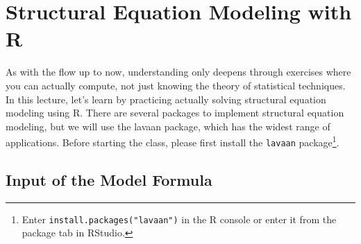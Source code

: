 \documentclass{ltjsbook}
\begin{document}
\VerbatimFootnotes
\chapter{Structural Equation Modeling with R}
\label{x13_SEMonR}

As with the flow up to now, understanding only deepens through exercises where you can actually compute, not just knowing the theory of statistical techniques. In this lecture, let's learn by practicing actually solving structural equation modeling using R.
There are several packages to implement structural equation modeling, but we will use the lavaan package, which has the widest range of applications.
Before starting the class, please first install the \texttt{lavaan} package\footnote{Enter \verb|install.packages("lavaan")| in the R console or enter it from the package tab in RStudio.}.

\section{Input of the Model Formula}

\end{document}
